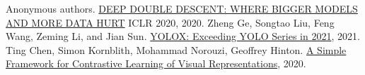 \documentclass[a4j]{ujarticle}
\begin{document}
    \begin{thebibliography}{9}
         Anonymous authors. \href{https://openreview.net/attachment?id=B1g5sA4twr&name=original_pdf}{DEEP DOUBLE DESCENT: WHERE BIGGER MODELS AND MORE DATA HURT} ICLR 2020, 2020.
         Zheng Ge, Songtao Liu, Feng Wang, Zeming Li, and Jian Sun. \href{https://arxiv.org/pdf/2107.08430.pdf}{YOLOX: Exceeding YOLO Series in 2021}, 2021.
         Ting Chen, Simon Kornblith, Mohammad Norouzi, Geoffrey Hinton. \href{https://arxiv.org/pdf/2002.05709.pdf}{A Simple Framework for Contrastive Learning of Visual Representations}, 2020.
    \end{thebibliography}
\end{document}
